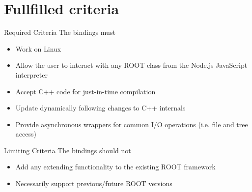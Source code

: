 \section{Fullfilled criteria}

\begin{frame}{Required Criteria}
    The bindings must
     \begin{itemize}
		\item Work on Linux \uncover<2->{\checkmark}
        \item Allow the user to interact with any ROOT class from the Node.js JavaScript interpreter 
        \item Accept C++ code for just-in-time compilation 
        \item Update dynamically following changes to C++ internals 
        \item Provide asynchronous wrappers for common I/O operations (i.e. file and tree access) 
     \end{itemize}
\end{frame}


\begin{frame}{Limiting Criteria}
    The bindings should not
    \begin{itemize}
        \item Add any extending functionality to the existing ROOT framework 
        \item Necessarily support previous/future ROOT versions 
    \end{itemize}
\end{frame}
